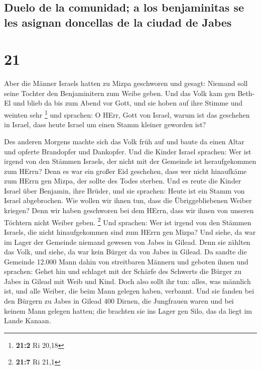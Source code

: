 \hypertarget{duelo-de-la-comunidad-a-los-benjaminitas-se-les-asignan-doncellas-de-la-ciudad-de-jabes}{%
\subsection{Duelo de la comunidad; a los benjaminitas se les asignan
doncellas de la ciudad de
Jabes}\label{duelo-de-la-comunidad-a-los-benjaminitas-se-les-asignan-doncellas-de-la-ciudad-de-jabes}}

\hypertarget{section-20}{%
\section{21}\label{section-20}}

 Aber die Männer Israels hatten zu Mizpa geschworen und
gesagt: Niemand soll seine Tochter den Benjaminitern zum Weibe geben.
 Und das Volk kam gen Beth-El und blieb da bis zum Abend
vor Gott, und sie hoben auf ihre Stimme und weinten sehr \footnote{\textbf{21:2}
  Ri 20,18}  und sprachen: O HErr, Gott von Israel, warum
ist das geschehen in Israel, dass heute Israel um einen Stamm kleiner
geworden ist?

 Des anderen Morgens machte sich das Volk früh auf und
baute da einen Altar und opferte Brandopfer und Dankopfer.
 Und die Kinder Israel sprachen: Wer ist irgend von den
Stämmen Israels, der nicht mit der Gemeinde ist heraufgekommen zum
HErrn? Denn es war ein großer Eid geschehen, dass wer nicht hinaufkäme
zum HErrn gen Mizpa, der sollte des Todes sterben.  Und es
reute die Kinder Israel über Benjamin, ihre Brüder, und sie sprachen:
Heute ist ein Stamm von Israel abgebrochen.  Wie wollen
wir ihnen tun, dass die Übriggebliebenen Weiber kriegen? Denn wir haben
geschworen bei dem HErrn, dass wir ihnen von unseren Töchtern nicht
Weiber geben. \footnote{\textbf{21:7} Ri 21,1}  Und
sprachen: Wer ist irgend von den Stämmen Israels, die nicht
hinaufgekommen sind zum HErrn gen Mizpa? Und siehe, da war im Lager der
Gemeinde niemand gewesen von Jabes in Gilead.  Denn sie
zählten das Volk, und siehe, da war kein Bürger da von Jabes in Gilead.
 Da sandte die Gemeinde 12.000 Mann dahin von streitbaren
Männern und geboten ihnen und sprachen: Gehet hin und schlaget mit der
Schärfe des Schwerts die Bürger zu Jabes in Gilead mit Weib und Kind.
 Doch also sollt ihr tun: alles, was männlich ist, und
alle Weiber, die beim Mann gelegen haben, verbannt.  Und
sie fanden bei den Bürgern zu Jabes in Gilead 400 Dirnen, die Jungfrauen
waren und bei keinem Mann gelegen hatten; die brachten sie ins Lager gen
Silo, das da liegt im Lande Kanaan.

